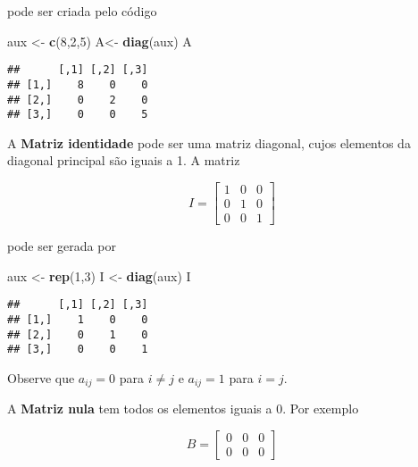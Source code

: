 \documentclass[
]{book}
\newenvironment{Shaded}{\begin{snugshade}}{\end{snugshade}}
\newcommand{\DecValTok}[1]{\textcolor[rgb]{0.00,0.00,0.81}{#1}}
\newcommand{\KeywordTok}[1]{\textcolor[rgb]{0.13,0.29,0.53}{\textbf{#1}}}
\newcommand{\NormalTok}[1]{#1}
\newcommand{\StringTok}[1]{\textcolor[rgb]{0.31,0.60,0.02}{#1}}
\begin{document}
pode ser criada pelo código

\begin{Shaded}
\begin{Highlighting}[]
\NormalTok{aux \textless{}{-}}\StringTok{ }\KeywordTok{c}\NormalTok{(}\DecValTok{8}\NormalTok{,}\DecValTok{2}\NormalTok{,}\DecValTok{5}\NormalTok{)}
\NormalTok{A\textless{}{-}}\StringTok{ }\KeywordTok{diag}\NormalTok{(aux)}
\NormalTok{A}
\end{Highlighting}
\end{Shaded}

\begin{verbatim}
##      [,1] [,2] [,3]
## [1,]    8    0    0
## [2,]    0    2    0
## [3,]    0    0    5
\end{verbatim}

A \textbf{Matriz identidade} pode ser uma matriz diagonal, cujos elementos da diagonal principal são iguais a 1. A matriz

\begin{equation*}
I = 
\begin{bmatrix}
1 & 0 & 0\\
0 & 1 & 0\\
0 & 0 & 1
\end{bmatrix}
\end{equation*}

pode ser gerada por

\begin{Shaded}
\begin{Highlighting}[]
\NormalTok{aux \textless{}{-}}\StringTok{ }\KeywordTok{rep}\NormalTok{(}\DecValTok{1}\NormalTok{,}\DecValTok{3}\NormalTok{)}
\NormalTok{I \textless{}{-}}\StringTok{ }\KeywordTok{diag}\NormalTok{(aux)}
\NormalTok{I}
\end{Highlighting}
\end{Shaded}

\begin{verbatim}
##      [,1] [,2] [,3]
## [1,]    1    0    0
## [2,]    0    1    0
## [3,]    0    0    1
\end{verbatim}

Observe que \(a_{ij} =0\) para \(i \neq j\) e \(a_{ij} = 1\) para \(i = j\).

A \textbf{Matriz nula} tem todos os elementos iguais a 0. Por exemplo

\begin{equation*}
B = 
\begin{bmatrix}
0 & 0 & 0\\
0 & 0 & 0
\end{bmatrix}
\end{equation*}
\end{document}
